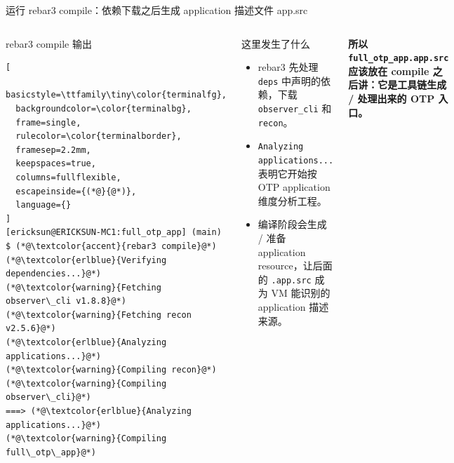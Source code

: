 \documentclass[aspectratio=169, 9pt]{beamer}
\newcommand{\good}[1]{\textbf{\color{accent!80!black}#1}}
\newcommand{\code}[1]{\texttt{#1}}
\begin{document}
\begin{frame}[fragile]{运行 rebar3 compile：依赖下载之后生成 application 描述文件 app.src}
  \begin{columns}[T,onlytextwidth]
    \begin{block}{rebar3 compile 输出}
\begin{lstlisting}[
  basicstyle=\ttfamily\tiny\color{terminalfg},
  backgroundcolor=\color{terminalbg},
  frame=single,
  rulecolor=\color{terminalborder},
  framesep=2.2mm,
  keepspaces=true,
  columns=fullflexible,
  escapeinside={(*@}{@*)},
  language={}
]
[ericksun@ERICKSUN-MC1:full_otp_app] (main) $ (*@\textcolor{accent}{rebar3 compile}@*)
(*@\textcolor{erlblue}{Verifying dependencies...}@*)
(*@\textcolor{warning}{Fetching observer\_cli v1.8.8}@*)
(*@\textcolor{warning}{Fetching recon v2.5.6}@*)
(*@\textcolor{erlblue}{Analyzing applications...}@*)
(*@\textcolor{warning}{Compiling recon}@*)
(*@\textcolor{warning}{Compiling observer\_cli}@*)
===> (*@\textcolor{erlblue}{Analyzing applications...}@*)
(*@\textcolor{warning}{Compiling full\_otp\_app}@*)
\end{lstlisting}
    \end{block}
    \footnotesize
    \begin{block}{这里发生了什么}
      \begin{itemize}
        \item rebar3 先处理 \code{deps} 中声明的依赖，下载 \code{observer\_cli} 和 \code{recon}。
        \item \code{Analyzing applications...} 表明它开始按 OTP application 维度分析工程。
        \item 编译阶段会生成 / 准备 application resource，让后面的 \code{.app.src} 成为 VM 能识别的 application 描述来源。
      \end{itemize}
    \end{block}
    \vspace{0.15cm}
    \centering
    \good{所以 \code{full\_otp\_app.app.src} 应该放在 compile 之后讲：它是工具链生成 / 处理出来的 OTP 入口。}
  \end{columns}
\end{frame}
\end{document}
